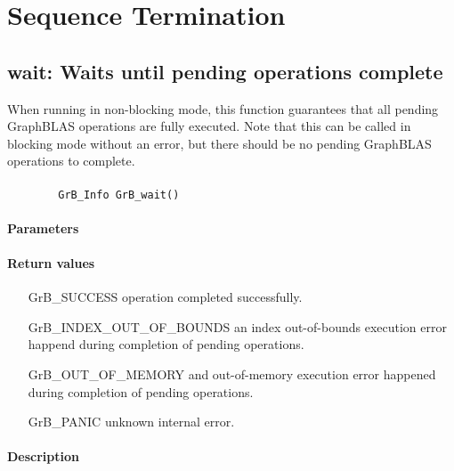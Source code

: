 \section{Sequence Termination}


\subsection{{\sf wait}: Waits until pending operations complete}
\label{Sec:wait}

When running in non-blocking mode, this function guarantees that all pending GraphBLAS operations are fully executed.  Note that this can be called in blocking mode without an error, but there should be no pending GraphBLAS operations to complete.

\paragraph{\syntax}

\begin{verbatim}
        GrB_Info GrB_wait()
\end{verbatim}

\paragraph{Parameters}

\paragraph{Return values}
\begin{itemize}[leftmargin=2.1in]
	\item[{\sf GrB\_SUCCESS}]	operation completed successfully.
	\item[{\sf GrB\_INDEX\_OUT\_OF\_BOUNDS}]	an index out-of-bounds execution error happend during completion of pending operations.
	\item[{\sf GrB\_OUT\_OF\_MEMORY}]		and out-of-memory execution error happened during completion of pending operations.
	\item[{\sf GrB\_PANIC}]		unknown internal error.
\end{itemize}

\paragraph{Description}

